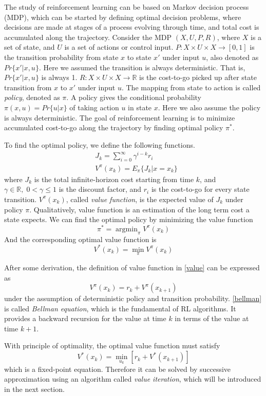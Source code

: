 \documentclass[conference]{IEEEtran}
\DeclareMathOperator*{\argmin}{argmin}
\DeclareMathOperator*{\minimize}{min}
\begin{document}
The study of reinforcement learning can be based on Markov decision process (MDP), which can be started by defining optimal decision problems, where decisions are made at stages of a process evolving through time, and total cost is accumulated along the trajectory. Consider the MDP \( (X, U, P, R) \), where $X$ is a set of state, and $U$ is a set of actions or control input. $P:X\times U\times X \rightarrow [0, 1]$ is the transition probability from state $x$ to state $x'$ under input $u$, also denoted as \(Pr\{x'|x, u\}\). Here we assumed the transition is always deterministic. That is, \(Pr\{x'|x, u\}\) is always 1. $R:X\times U\times X \rightarrow \mathbb{R}$ is the cost-to-go picked up after state transition from $x$ to  $x'$ under input $u$. 
The mapping from state to action is called \textit{policy}, denoted as $\pi$. A policy gives the conditional probability \(\pi(x, u) = Pr\{u|x\} \) of taking action $u$ in state $x$. Here we also assume the policy is always deterministic. The goal of reinforcement learning is to minimize accumulated cost-to-go along the trajectory by finding optimal policy \(\pi^*\).
\par To find the optimal policy, we define the following functions.
\begin{equation}
\begin{aligned}
	& J_k = \sum_{i=0}^\infty\gamma^{i-k}r_i\\
	& V^\pi(x_k) = E_\pi\{J_k|x = x_k\} \label{value}
\end{aligned}
\end{equation}
where $J_k$ is the total infinite-horizon cost starting from time $k$, and \(\gamma \in \mathbb{R},\; 0 < \gamma \leq 1\) is the discount factor, and $r_i$ is the cost-to-go for every state transition. $V^\pi(x_k)$, called \textit{value function}, is the expected value of $J_k$ under policy $\pi$. Qualitatively, value function is an estimation of the long term cost a state expects. We can find the optimal policy by minimizing the value function
\[\pi^* = \argmin_{\pi}V^\pi(x_k) \]
And the corresponding optimal value function is
\[V^*(x_k) = \min_{\pi}V^\pi(x_k)\]
\par After some derivation, the definition of value function in \eqref{value} can be expressed as 
\begin{equation}
  V^\pi(x_k) = r_k + V^\pi(x_{k+1}) \label{bellman}
\end{equation}
under the assumption of deterministic policy and transition probability. \eqref{bellman} is called \textit{Bellman equation}, which is the fundamental of RL algorithms. It provides a backward recursion for the value at time $k$ in terms of the value at time $k+1$.
\par With principle of optimality, the optimal value function must satisfy
\begin{equation}
	V^{*}(x_k) = \minimize_{u_k}[r_k+V^{*}(x_{k+1})]
\end{equation}
which is a fixed-point equation. Therefore it can be solved by successive approximation using an algorithm called \textit{value iteration}, which will be introduced in the next section.
\end{document}
